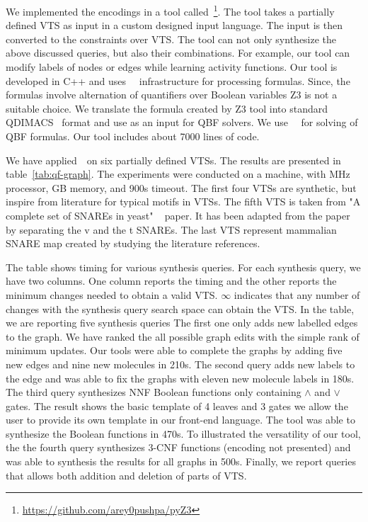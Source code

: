 

We implemented the encodings in a tool
called~\ourtool\footnote{{\url{https://github.com/arey0pushpa/pyZ3}}}.
%
The tool takes a partially defined VTS as input in a custom designed
input language.
%
The input is then converted to the constraints over VTS. 
%
The tool can not only synthesize the above discussed queries, but also their
combinations.
%
For example, our tool can modify labels of nodes or edges while
learning activity functions.
%
Our tool is developed in C++ and uses~\zthree~\cite{z3} infrastructure for
processing formulas. 
%
Since, the formulas involve alternation of quantifiers over Boolean
variables Z3 is not a suitable choice.
%
We translate the formula created by Z3 tool into standard
QDIMACS~\cite{qdimacs} format and use as an input for QBF solvers. 
%
We use~\depqbf~\cite{lonsing2010depqbf} for solving of QBF formulas. 
%
Our tool includes about 7000 lines of code.

We have applied~\ourtool~on six partially defined VTSs.
%
The results are presented in table~\ref{tab:qf-graph}.
%
The experiments were conducted on a machine,
with MHz processor, GB memory, and 900s timeout.
%
The first four VTSs are synthetic, but inspire from literature for
typical motifs in VTSs. 
%
%
The fifth VTS is taken from "A complete set of SNAREs in yeast"
~\cite{burri2004complete} paper. It has been adapted from the paper by
separating the v and the t SNAREs. 
%
The last VTS represent mammalian SNARE map created by studying the literature references.  

The table shows timing for various synthesis queries.
%
For each synthesis query, we have two columns.
%
One column reports the timing and the other reports the minimum changes
needed to obtain a valid VTS.
%
$\infty$ indicates that any number of changes with the synthesis query
search space can obtain the VTS.
%
In the table, we are reporting five synthesis queries
%
The first one only adds new labelled edges to the graph.
%
We have ranked the all possible graph edits with the simple rank of
minimum updates.
%
Our tools were able to complete the graphs by adding five new edges
and nine new molecules in 210s.
%
The second query adds new labels to the edge and was able to
fix the graphs with eleven new molecule labels in 180s.
%
The third query synthesizes NNF Boolean functions only containing
$\land$ and $\lor$ gates.
%
The result shows the basic template of 4 leaves and 3 gates we allow
the user to provide its own template in our front-end language.
%
The tool was able to synthesize the Boolean functions in 470s.
%
To illustrated the versatility of our tool,
the the fourth query synthesizes $3$-CNF functions (encoding not presented) and was able
to synthesis the results for all graphs in 500s.
%
Finally, we report queries that allows both addition and deletion of parts of
VTS. 
%
%


